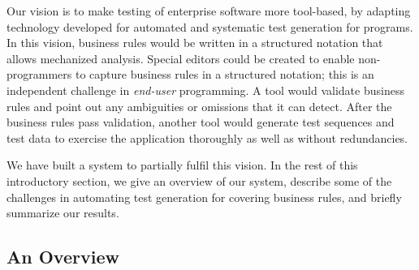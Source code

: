 
Our vision is to make testing of enterprise software more tool-based, by
adapting technology developed for automated and systematic test generation for
programs.  In this vision, business rules would be written in a structured
notation that allows mechanized analysis.  Special editors could be created
to enable non-programm\-ers to capture business rules in a structured notation;
this is an independent challenge in \textit{end-user} programming.  A tool would
validate business rules and point out any ambiguities or omissions that it can
detect.  After the business rules pass validation, another tool would generate
test sequences and test data to exercise the application thoroughly as well as
without redundancies.

We have built a system to partially fulfil this vision.  In the rest of this
introductory section, we give an overview of our system, describe some of the
challenges in automating test generation for covering business rules, and
briefly summarize our results.


\subsection{An Overview}

